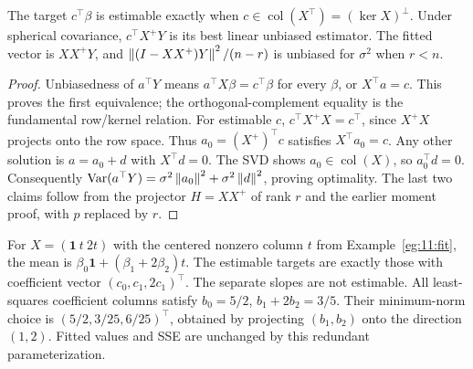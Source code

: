 \begin{theorem}\label{thm:11:estimable}
The target $c^\top\beta$ is estimable exactly when
$c\in\operatorname{col}(X^\top)=(\ker X)^\perp$.
Under spherical covariance, $c^\top X^+Y$ is its best linear unbiased
estimator. The fitted vector is $XX^+Y$, and $\left\lVert(I-XX^+)Y\right\rVert^2/(n-r)$
is unbiased for $\sigma^2$ when $r<n$.
\end{theorem}
\begin{proof}
Unbiasedness of $a^\top Y$ means $a^\top X\beta=c^\top\beta$ for every
$\beta$, or $X^\top a=c$. This proves the first equivalence; the
orthogonal-complement equality is the fundamental row/kernel relation.
For estimable $c$, $c^\top X^+X=c^\top$, since $X^+X$ projects onto
the row space. Thus $a_0=(X^+)^\top c$ satisfies $X^\top a_0=c$.
Any other solution is $a=a_0+d$ with $X^\top d=0$.
The SVD shows $a_0\in\operatorname{col}(X)$, so $a_0^\top d=0$.
Consequently $\operatorname{Var}(a^\top Y)=\sigma^2\left\lVert a_0\right\rVert^2+\sigma^2\left\lVert d\right\rVert^2$,
proving optimality. The last two claims follow from the projector
$H=XX^+$ of rank $r$ and the earlier moment proof, with $p$ replaced
by $r$.
\end{proof}

For $X=(\mathbf1\ t\ 2t)$ with the centered nonzero column $t$ from
Example~\ref{eg:11:fit}, the mean is
$\beta_0\mathbf1+(\beta_1+2\beta_2)t$.
The estimable targets are exactly those with coefficient vector
$(c_0,c_1,2c_1)^\top$. The separate slopes are not estimable.
All least-squares coefficient columns satisfy
$b_0=5/2$, $b_1+2b_2=3/5$. Their minimum-norm choice is
$(5/2,3/25,6/25)^\top$, obtained by projecting $(b_1,b_2)$ onto
the direction $(1,2)$. Fitted values and SSE are unchanged by this
redundant parameterization.

